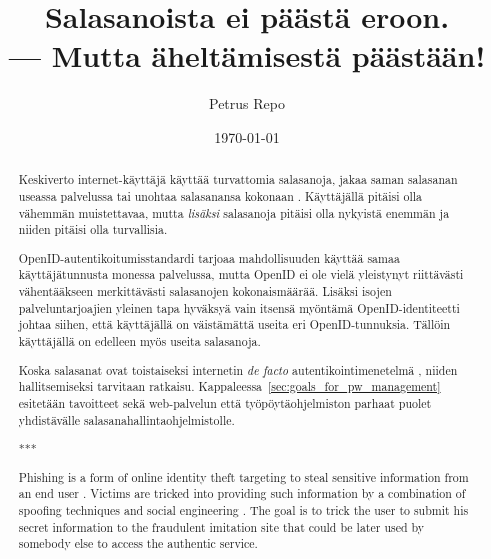 \documentclass[english,gradu]{tktltiki}
\begin{document}
\title{Salasanoista ei päästä eroon.\\ --- Mutta äheltämisestä päästään!}
\author{Petrus Repo}
\date{\today}
\maketitle


\onehalfspacing

\subject{Tietojenkäsittelytiede}


\begin{abstract}

Keskiverto internet-käyttäjä käyttää turvattomia salasanoja, jakaa saman salasanan useassa palvelussa tai unohtaa salasanansa kokonaan \cite{study_of_passwords_07, password_management_strategies_06, generating_and_remembering_pws_04, users_are_not_the_enemy_99}. Käyttäjällä pitäisi olla vähemmän muistettavaa, mutta \emph{lisäksi} salasanoja pitäisi olla nykyistä enemmän ja niiden pitäisi olla turvallisia.

OpenID-autentikoitumisstandardi tarjoaa mahdollisuuden käyttää samaa käyttäjätunnusta monessa palvelussa, mutta OpenID ei ole vielä yleistynyt riittävästi vähentääkseen merkittävästi salasanojen kokonaismäärää. Lisäksi isojen palveluntarjoajien yleinen tapa hyväksyä vain itsensä myöntämä OpenID-identiteetti johtaa siihen, että käyttäjällä on väistämättä useita eri OpenID-tunnuksia. Tällöin käyttäjällä on edelleen myös useita salasanoja.

Koska salasanat ovat toistaiseksi internetin \emph{de facto} autentikointimenetelmä \cite{study_of_passwords_07, passpet_06, password_management_strategies_06, pwdhash_extension_05}, niiden hallitsemiseksi tarvitaan ratkaisu. Kappaleessa~\ref{sec:goals_for_pw_management} esitetään tavoitteet sekä web-palvelun että työpöytäohjelmiston parhaat puolet yhdistävälle salasanahallintaohjelmistolle.

***

Phishing is a form of online identity theft targeting to steal sensitive information from an end user   \cite{phishing_attacks_and_solutions_2007, why_phishing_works_06, suspectibility_to_phishing_2006}. Victims are tricked into providing such information by a combination of spoofing techniques and social engineering \cite{visual_similarity_phishing_2008}. The goal is to trick the user to submit his secret information to the fraudulent imitation site that could be later used by somebody else to access the authentic service.


\end{abstract}
\end{document}
